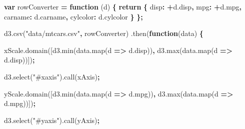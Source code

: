 \documentclass[openany]{book}
\newenvironment{Shaded}{\begin{snugshade}}{\end{snugshade}}
\newcommand{\AttributeTok}[1]{\textcolor[rgb]{0.77,0.63,0.00}{#1}}
\newcommand{\ControlFlowTok}[1]{\textcolor[rgb]{0.13,0.29,0.53}{\textbf{#1}}}
\newcommand{\DataTypeTok}[1]{\textcolor[rgb]{0.13,0.29,0.53}{#1}}
\newcommand{\KeywordTok}[1]{\textcolor[rgb]{0.13,0.29,0.53}{\textbf{#1}}}
\newcommand{\NormalTok}[1]{#1}
\newcommand{\OperatorTok}[1]{\textcolor[rgb]{0.81,0.36,0.00}{\textbf{#1}}}
\newcommand{\StringTok}[1]{\textcolor[rgb]{0.31,0.60,0.02}{#1}}
\newcommand{\VariableTok}[1]{\textcolor[rgb]{0.00,0.00,0.00}{#1}}
\begin{document}
\begin{Shaded}
\begin{Highlighting}[]
\KeywordTok{var}\NormalTok{ rowConverter }\OperatorTok{=} \KeywordTok{function}\NormalTok{ (d) }\OperatorTok{\{}
  \ControlFlowTok{return} \OperatorTok{\{}
    \DataTypeTok{disp}\OperatorTok{:} \OperatorTok{+}\VariableTok{d}\NormalTok{.}\AttributeTok{disp}\OperatorTok{,}
    \DataTypeTok{mpg}\OperatorTok{:} \OperatorTok{+}\VariableTok{d}\NormalTok{.}\AttributeTok{mpg}\OperatorTok{,}
    \DataTypeTok{carname}\OperatorTok{:} \VariableTok{d}\NormalTok{.}\AttributeTok{carname}\OperatorTok{,}
    \DataTypeTok{cylcolor}\OperatorTok{:} \VariableTok{d}\NormalTok{.}\AttributeTok{cylcolor}
    \OperatorTok{\}}
\OperatorTok{\};}  
  
\VariableTok{d3}\NormalTok{.}\AttributeTok{csv}\NormalTok{(}\StringTok{"data/mtcars.csv"}\OperatorTok{,}\NormalTok{ rowConverter)}
\NormalTok{  .}\AttributeTok{then}\NormalTok{(}\KeywordTok{function}\NormalTok{(data) }\OperatorTok{\{}
  
   \VariableTok{xScale}\NormalTok{.}\AttributeTok{domain}\NormalTok{([}\VariableTok{d3}\NormalTok{.}\AttributeTok{min}\NormalTok{(}\VariableTok{data}\NormalTok{.}\AttributeTok{map}\NormalTok{(d }\OperatorTok{=>} \VariableTok{d}\NormalTok{.}\AttributeTok{disp}\NormalTok{))}\OperatorTok{,} \VariableTok{d3}\NormalTok{.}\AttributeTok{max}\NormalTok{(}\VariableTok{data}\NormalTok{.}\AttributeTok{map}\NormalTok{(d }\OperatorTok{=>} \VariableTok{d}\NormalTok{.}\AttributeTok{disp}\NormalTok{))])}\OperatorTok{;}
   
   \VariableTok{d3}\NormalTok{.}\AttributeTok{select}\NormalTok{(}\StringTok{"#xaxis"}\NormalTok{).}\AttributeTok{call}\NormalTok{(xAxis)}\OperatorTok{;}

   \VariableTok{yScale}\NormalTok{.}\AttributeTok{domain}\NormalTok{([}\VariableTok{d3}\NormalTok{.}\AttributeTok{min}\NormalTok{(}\VariableTok{data}\NormalTok{.}\AttributeTok{map}\NormalTok{(d }\OperatorTok{=>} \VariableTok{d}\NormalTok{.}\AttributeTok{mpg}\NormalTok{))}\OperatorTok{,} \VariableTok{d3}\NormalTok{.}\AttributeTok{max}\NormalTok{(}\VariableTok{data}\NormalTok{.}\AttributeTok{map}\NormalTok{(d }\OperatorTok{=>} \VariableTok{d}\NormalTok{.}\AttributeTok{mpg}\NormalTok{))])}\OperatorTok{;}
   
   \VariableTok{d3}\NormalTok{.}\AttributeTok{select}\NormalTok{(}\StringTok{"#yaxis"}\NormalTok{).}\AttributeTok{call}\NormalTok{(yAxis)}\OperatorTok{;}


\end{Highlighting}
\end{Shaded}
\end{document}
